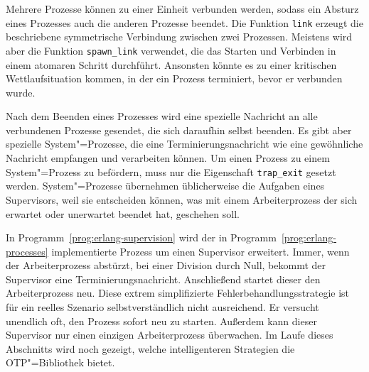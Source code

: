 Mehrere Prozesse können zu einer Einheit verbunden werden, sodass ein Absturz eines Prozesses auch die anderen Prozesse beendet. Die Funktion \lstinline{link} erzeugt die beschriebene symmetrische Verbindung zwischen zwei Prozessen. Meistens wird aber die Funktion \lstinline{spawn_link} verwendet, die das Starten und Verbinden in einem atomaren Schritt durchführt. Ansonsten könnte es zu einer kritischen Wettlaufsituation kommen, in der ein Prozess terminiert, bevor er verbunden wurde.

Nach dem Beenden eines Prozesses wird eine spezielle Nachricht an alle verbundenen Prozesse gesendet, die sich daraufhin selbst beenden. Es gibt aber spezielle System"=Prozesse, die eine Terminierungsnachricht wie eine gewöhnliche Nachricht empfangen und verarbeiten können. Um einen Prozess zu einem System"=Prozess zu befördern, muss nur die Eigenschaft \lstinline{trap_exit} gesetzt werden. System"=Prozesse übernehmen üblicherweise die Aufgaben eines Supervisors, weil sie entscheiden können, was mit einem Arbeiterprozess der sich erwartet oder unerwartet beendet hat, geschehen soll.

In Programm~\ref{prog:erlang-supervision} wird der in Programm~\ref{prog:erlang-processes} implementierte Prozess um einen Supervisor erweitert. Immer, wenn der Arbeiterprozess abstürzt, \zB bei einer Division durch Null, bekommt der Supervisor eine Terminierungsnachricht. Anschließend startet dieser den Arbeiterprozess neu. Diese extrem simplifizierte Fehlerbehandlungsstrategie ist für ein reelles Szenario selbstverständlich nicht ausreichend. Er versucht unendlich oft, den Prozess sofort neu zu starten. Außerdem kann dieser Supervisor nur einen einzigen Arbeiterprozess überwachen. Im Laufe dieses Abschnitts wird noch gezeigt, welche intelligenteren Strategien die OTP"=Bibliothek bietet.

